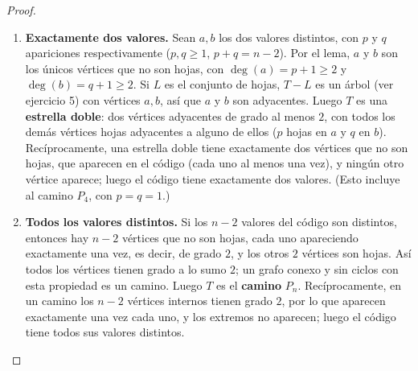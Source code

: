 \begin{proof}
\begin{enumerate}
        \item \textbf{Exactamente dos valores.} Sean \( a, b \) los dos valores distintos, con \( p \) y \( q \) apariciones respectivamente (\( p, q \geq 1 \), \( p + q = n - 2 \)). Por el lema, \( a \) y \( b \) son los únicos vértices que no son hojas, con \( \deg(a) = p + 1 \geq 2 \) y \( \deg(b) = q + 1 \geq 2 \). Si \( L \) es el conjunto de hojas, \( T - L \) es un árbol (ver ejercicio 5) con vértices \( a, b \), así que \( a \) y \( b \) son adyacentes. Luego \( T \) es una \textbf{estrella doble}: dos vértices adyacentes de grado al menos \( 2 \), con todos los demás vértices hojas adyacentes a alguno de ellos (\( p \) hojas en \( a \) y \( q \) en \( b \)). Recíprocamente, una estrella doble tiene exactamente dos vértices que no son hojas, que aparecen en el código (cada uno al menos una vez), y ningún otro vértice aparece; luego el código tiene exactamente dos valores. (Esto incluye al camino \( P_4 \), con \( p = q = 1 \).)

        \item \textbf{Todos los valores distintos.} Si los \( n-2 \) valores del código son distintos, entonces hay \( n-2 \) vértices que no son hojas, cada uno apareciendo exactamente una vez, es decir, de grado \( 2 \), y los otros \( 2 \) vértices son hojas. Así todos los vértices tienen grado a lo sumo \( 2 \); un grafo conexo y sin ciclos con esta propiedad es un camino. Luego \( T \) es el \textbf{camino} \( P_n \). Recíprocamente, en un camino los \( n-2 \) vértices internos tienen grado \( 2 \), por lo que aparecen exactamente una vez cada uno, y los extremos no aparecen; luego el código tiene todos sus valores distintos.
    \end{enumerate}


\end{proof}
